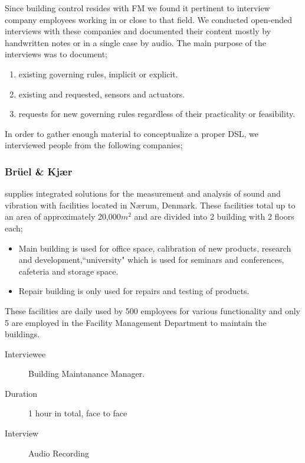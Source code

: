 Since building control resides with FM we found it pertinent to interview company employees working in or close to that field. We conducted open-ended interviews with these companies and documented their content mostly by handwritten notes or in a single case by audio. The main purpose of the interviews was to document;

\begin{enumerate}
	\item existing governing rules, implicit or explicit.
	\item existing and requested, sensors and actuators.
	\item requests for new governing rules regardless of their practicality or feasibility.
\end{enumerate}

In order to gather enough material to conceptualize a proper DSL, we interviewed people from the following companies;

\subsubsection{Br\"{u}el \& Kj\ae r} supplies integrated solutions for the measurement and analysis of sound and vibration with facilities located in N\ae rum, Denmark. These facilities total up to an area of approximately 20,000$m^2$ and are divided into 2 building with 2 floors each; 
\begin{itemize}
	\item Main building is used for office space, calibration of new products, research and development,``university" which is used for seminars and conferences, cafeteria and storage space.
	\item Repair building is only used for repairs and testing of products.
\end{itemize}	
These facilities are daily used by 500 employees for various functionality and only 5 are employed in the Facility Management Department to maintain the buildings.
\begin{description}
	\item[Interviewee] Building Maintanance Manager.
	\item[Duration] 1 hour in total, face to face
	\item[Interview] Audio Recording
\end{description}

